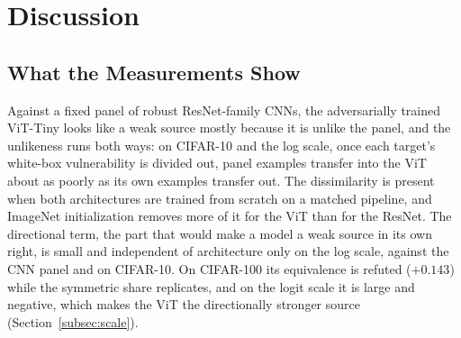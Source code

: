 \section{Discussion}
\label{sec:discussion}

\subsection{What the Measurements Show}
\label{subsec:findings}

Against a fixed panel of robust ResNet-family CNNs, the adversarially trained ViT-Tiny looks like a weak source mostly because it is unlike the panel, and the unlikeness runs both ways: on CIFAR-10 and the log scale, once each target's white-box vulnerability is divided out, panel examples transfer into the ViT about as poorly as its own examples transfer out. The dissimilarity is present when both architectures are trained from scratch on a matched pipeline, and ImageNet initialization removes more of it for the ViT than for the ResNet. The directional term, the part that would make a model a weak source in its own right, is small and independent of architecture only on the log scale, against the CNN panel and on CIFAR-10. On CIFAR-100 its equivalence is refuted ($+0.143$) while the symmetric share replicates, and on the logit scale it is large and negative, which makes the ViT the directionally stronger source (Section~\ref{subsec:scale}).

